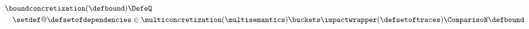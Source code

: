 \begin{align*}
  &\boundconcretization(\defbound) \DefeQ \\
  &\quad
  \setdef@{\defsetofdependencies \in \multiconcretization(\multisemantics)\buckets}{
    \impactwrapper(\defsetoftraces) \ComparisoN \defbound
  }
\end{align*}
